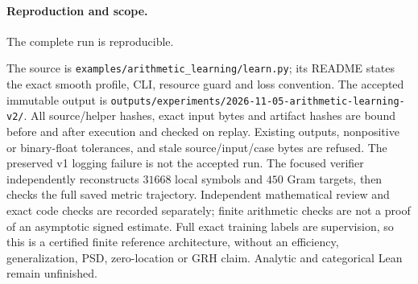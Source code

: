 \paragraph{Reproduction and scope.} The complete run is reproducible.

The source is \texttt{examples/}\allowbreak\texttt{arithmetic\_learning/}\allowbreak\texttt{learn.py}; its README
states the exact smooth profile, CLI, resource guard and loss convention.
The accepted immutable output is
\texttt{outputs/experiments/}\allowbreak\texttt{2026-11-05-arithmetic-learning-v2/}.
All source/helper hashes, exact input bytes and artifact hashes are bound
before and after execution and checked on replay. Existing outputs,
nonpositive or binary-float tolerances, and stale source/input/case bytes
are refused. The preserved v1 logging failure is not the accepted run.
The focused verifier independently reconstructs $31668$ local symbols and
$450$ Gram targets, then checks the full saved metric trajectory.
Independent mathematical review and exact code checks are recorded separately;
finite arithmetic checks are not a proof of an asymptotic signed estimate.
Full exact training labels are supervision, so this is a certified finite
reference architecture, without an efficiency, generalization, PSD,
zero-location or GRH claim. Analytic and categorical Lean remain unfinished.
